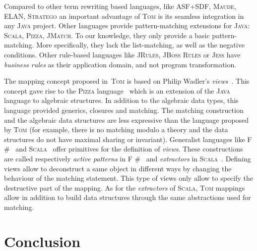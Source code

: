 \documentclass[runningheads]{llncs}
\newcommand{\scala}{\textsc{Scala}}
\newcommand{\pizza}{\textsc{Pizza}}
\newcommand{\jmatch}{\textsc{JMatch}}
\newcommand{\jbossrules}{\textsc{JBoss Rules}}
\newcommand{\jess}{\textsc{Jess}}
\newcommand{\jrules}{\textsc{JRules}}
\newcommand{\stratego}{\textsc{Stratego}}
\newcommand{\maude}{\textsc{Maude}\xspace}
\newcommand{\asfsdf}{{ASF+SDF}\xspace}
\newcommand{\elan}    {\textsf{ELAN}\xspace}
\newcommand{\tom}{\textsc{Tom}}
\newcommand{\java}{\textsc{Java}}
\newcommand{\fsharp}{\textsf{F \#}}
\begin{document}
Compared to other term rewriting based languages, like {\asfsdf}, {\maude},
{\elan}, {\stratego} an important advantage of {\tom} is its seamless
integration in any {\java} project. Other languages provide pattern-matching
extensions for {\java}: {\scala}, {\pizza}, {\jmatch}. To our knowledge, they
only provide a basic pattern-matching. More specifically, they lack the
list-matching, as well as the negative conditions. Other rule-based languages
like {\jrules}, {\jbossrules} or {\jess} have \emph{business rules} as their
application domain, and not program transformation.

The mapping concept proposed in~{\tom} is based on Philip
Wadler's \emph{views}~\cite{wadler87}. This concept gave rise to the {\pizza}
language~\cite{odersky97pizza} which is an extension of the {\java} language to
algebraic structures. In addition to the algebraic data types, this language
provided generics, closures and matching. The matching construction and the algebraic data
structures are less expressive than the language proposed by {\tom}
(for example, there is no matching modulo a theory and the data structures do not have
 maximal sharing or invariant). Generalist languages like
{\fsharp}~\cite{fsharp} and \scala~\cite{scala} offer primitives for the
definition of \emph{views}. These constructions are called respectively
\emph{active patterns} in {\fsharp}~\cite{syme07} and \emph{extractors} in
{\scala}~\cite{emir07}.  Defining views allow to deconstruct a same object in
different ways by changing the behaviour of the matching statement. This type
of views only allow to specify the destructive part of the mapping.  As for
the \emph{extractors} of {\scala}, {\tom} mappings allow in addition to
build data structures through the same abstractions used for matching.

\section{Conclusion}



\end{document}
